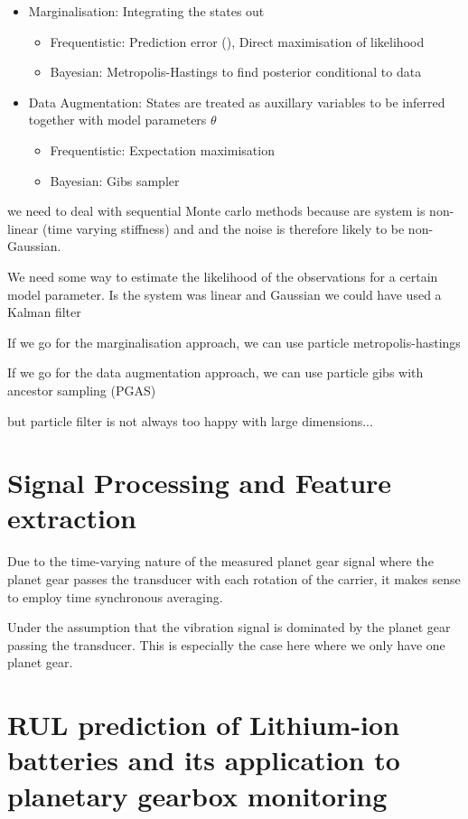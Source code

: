 \begin{itemize}
	\item Marginalisation: Integrating the states out
	\begin{itemize}
		\item Frequentistic: Prediction error (), Direct maximisation of likelihood
		\item Bayesian: Metropolis-Hastings to find posterior conditional to data
	\end{itemize}
	
	\item Data Augmentation: States are treated as auxillary variables to be inferred together with model parameters $\theta$
	\begin{itemize}
		\item Frequentistic: Expectation maximisation
		\item Bayesian: Gibs sampler
	\end{itemize}
\end{itemize}

we need to deal with sequential Monte carlo methods because are system is non-linear (time varying stiffness) and and the noise is therefore likely to be non-Gaussian. 

We need some way to estimate the likelihood of the observations for a certain model parameter. Is the system was linear and Gaussian we could have used a Kalman filter 

If we go for the marginalisation approach, we can use particle metropolis-hastings 

If we go for the data augmentation approach, we can use particle gibs with ancestor sampling (PGAS)

but particle filter is not always too happy with large dimensions...



\section{Signal Processing and Feature extraction}
Due to the time-varying nature of the measured planet gear signal where the planet gear passes the transducer with each rotation of the carrier, it makes sense to employ time synchronous averaging. 

Under the assumption that the vibration signal is dominated by the planet gear passing the transducer. This is especially the case here where we only have one planet gear.


\section{RUL prediction of Lithium-ion batteries and its application to planetary gearbox monitoring} \label{S:Liao battery}


